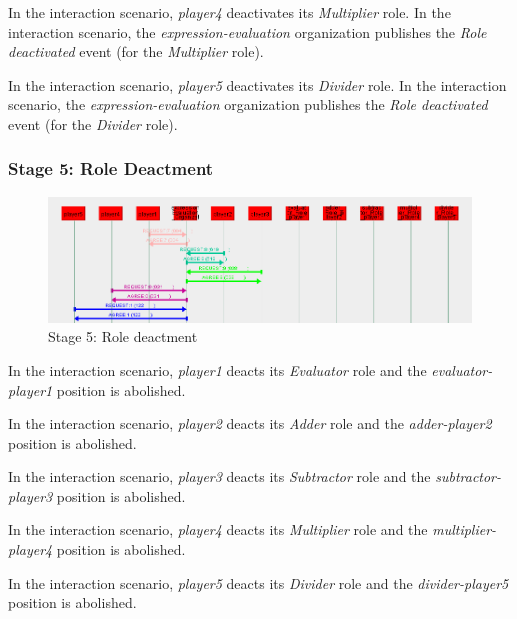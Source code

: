 In the {} interaction scenario, \textit{player4} deactivates its \textit{Multiplier} role.
In the {} interaction scenario, the \textit{expression-evaluation} organization publishes the \textit{Role deactivated} event (for the \textit{Multiplier} role).

In the {} interaction scenario, \textit{player5} deactivates its \textit{Divider} role.
In the {} interaction scenario, the \textit{expression-evaluation} organization publishes the \textit{Role deactivated} event (for the \textit{Divider} role).

\subsubsection*{Stage 5: Role Deactment}

\begin{figure}[H]
	\centering
	\includegraphics[width=\textwidth]{images/examples/example2-stage5.png}
	\caption{Stage 5: Role deactment}
	\label{figure:example2-stage5}
\end{figure} 

In the {} interaction scenario, \textit{player1} deacts its \textit{Evaluator} role and the \textit{evaluator-player1} position is abolished.

In the {} interaction scenario, \textit{player2} deacts its \textit{Adder} role and the \textit{adder-player2} position is abolished.

In the {} interaction scenario, \textit{player3} deacts its \textit{Subtractor} role and the \textit{subtractor-player3} position is abolished.

In the {} interaction scenario, \textit{player4} deacts its \textit{Multiplier} role and the \textit{multiplier-player4} position is abolished.

In the {} interaction scenario, \textit{player5} deacts its \textit{Divider} role and the \textit{divider-player5} position is abolished.